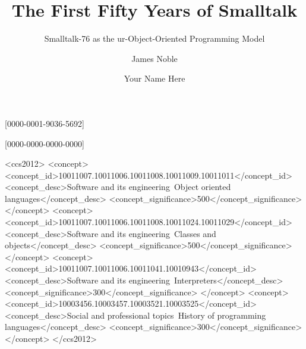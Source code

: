 \documentclass[english,submission]{programming}
\begin{document}
\title{The First Fifty Years of Smalltalk}
\subtitle{Smalltalk-76 as the ur-Object-Oriented Programming Model}%

\author[a]{James Noble}[0000-0001-9036-5692]

\author{Your Name Here}[0000-0000-0000-0000]






\begin{CCSXML}
<ccs2012>
   <concept>
       <concept_id>10011007.10011006.10011008.10011009.10011011</concept_id>
       <concept_desc>Software and its engineering~Object oriented languages</concept_desc>
       <concept_significance>500</concept_significance>
       </concept>
   <concept>
       <concept_id>10011007.10011006.10011008.10011024.10011029</concept_id>
       <concept_desc>Software and its engineering~Classes and objects</concept_desc>
       <concept_significance>500</concept_significance>
       </concept>
   <concept>
       <concept_id>10011007.10011006.10011041.10010943</concept_id>
       <concept_desc>Software and its engineering~Interpreters</concept_desc>
       <concept_significance>300</concept_significance>
       </concept>
   <concept>
       <concept_id>10003456.10003457.10003521.10003525</concept_id>
       <concept_desc>Social and professional topics~History of programming languages</concept_desc>
       <concept_significance>300</concept_significance>
       </concept>
 </ccs2012>
\end{CCSXML}
\end{document}
